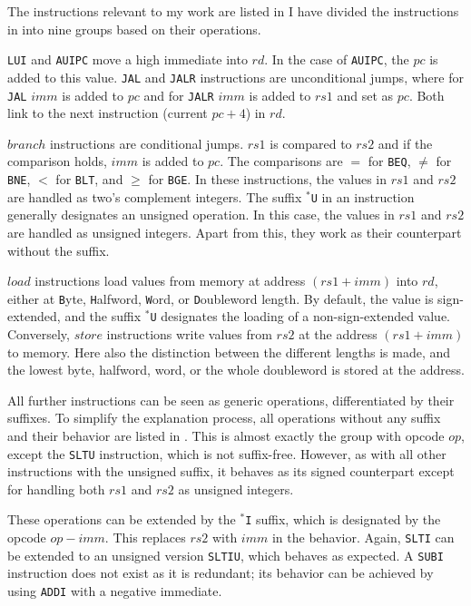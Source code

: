 The instructions relevant to my work are listed in
 I have divided the instructions in
 into nine groups based on their
operations.

\texttt{LUI} and \texttt{AUIPC} move a high immediate into $rd$. In
the case of \texttt{AUIPC}, the $pc$ is added to this value.
\texttt{JAL} and \texttt{JALR} instructions are unconditional jumps,
where for \texttt{JAL} $imm$ is added to $pc$ and for \texttt{JALR}
$imm$ is added to $rs1$ and set as $pc$. Both link to the next
instruction (current $pc + 4$) in $rd$.

$branch$ instructions are conditional jumps. $rs1$ is compared to
$rs2$ and if the comparison holds, $imm$ is added to $pc$. The
comparisons are $=$ for \texttt{BEQ}, $\neq$ for \texttt{BNE}, $<$
for \texttt{BLT}, and $\ge$ for \texttt{BGE}. In these instructions,
the values in $rs1$ and $rs2$ are handled as two's complement
integers. The suffix \texttt{$^*$U} in an instruction generally
designates an unsigned operation. In this case, the values in $rs1$
and $rs2$ are handled as unsigned integers. Apart from this, they
work as their counterpart without the suffix.

$load$ instructions load values from memory at address $(rs1+imm)$
into $rd$, either at \texttt{B}yte, \texttt{H}alfword, \texttt{W}ord,
or \texttt{D}oubleword length. By default, the value is
sign-extended, and the suffix \texttt{$^*$U} designates the loading
of a non-sign-extended value. Conversely, $store$ instructions write
values from $rs2$ at the address $(rs1+imm)$ to memory. Here also the
distinction between the different lengths is made, and the lowest
byte, halfword, word, or the whole doubleword is stored at the
address. 

All further instructions can be seen as generic operations,
differentiated by their suffixes. To simplify the explanation
process, all operations without any suffix and their behavior are
listed in . This is almost exactly the group
with opcode $op$, except the \texttt{SLTU} instruction, which is not
suffix-free. However, as with all other instructions with the
unsigned suffix, it behaves as its signed counterpart except for
handling both $rs1$ and $rs2$ as unsigned integers.



These operations can be extended by the \texttt{$^*$I} suffix, which
is designated by the opcode $op-imm$. This replaces $rs2$ with $imm$
in the behavior. Again, \texttt{SLTI} can be extended to an unsigned
version \texttt{SLTIU}, which behaves as expected. A \texttt{SUBI}
instruction does not exist as it is redundant; its behavior can be
achieved by using \texttt{ADDI} with a negative immediate.

